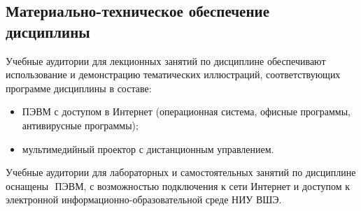 \documentclass[a4paper]{article}
\begin{document}
\subsection{Материально-техническое обеспечение дисциплины}
Учебные аудитории для лекционных занятий по дисциплине обеспечивают использование и демонстрацию тематических иллюстраций, соответствующих программе дисциплины в составе:
\begin{itemize}
\item ПЭВМ с доступом в Интернет (операционная система, офисные программы, антивирусные программы);
\item мультимедийный проектор с дистанционным управлением.
\end{itemize}
Учебные аудитории для лабораторных и самостоятельных занятий по дисциплине оснащены ­­­­­­­­­­­­­­­­­­­­­­­­ ПЭВМ, с возможностью подключения к сети Интернет и доступом к электронной информационно-образовательной среде НИУ ВШЭ.  
\end{document}
